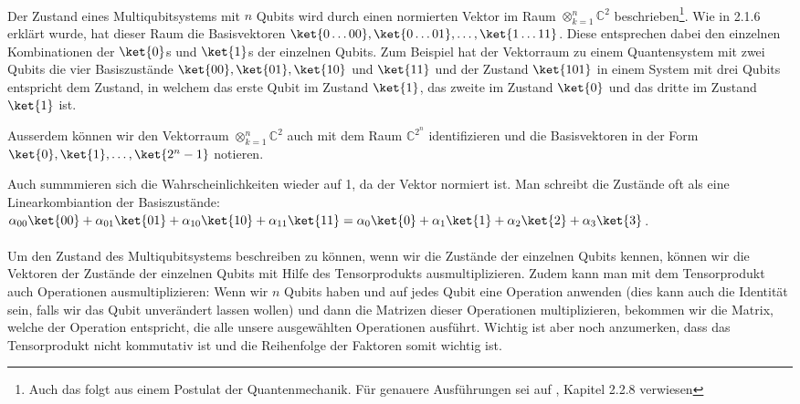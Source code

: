 \paragraph{}

Der Zustand eines Multiqubitsystems mit $n$ Qubits wird durch einen normierten Vektor im Raum $\otimes_{k = 1}^{n} \mathbb{C}^2$ beschrieben\footnote{Auch das folgt aus einem Postulat der Quantenmechanik. Für genauere Ausführungen sei auf \cite{QC}, Kapitel 2.2.8 verwiesen}. Wie in 2.1.6 erklärt wurde, hat dieser Raum die Basisvektoren $\ket{0\dots 00}, \ket{0\dots 01}, \dots, \ket{1\dots 11}$. Diese entsprechen dabei den einzelnen Kombinationen der $\ket{0}$s und $\ket{1}$s der einzelnen Qubits. Zum Beispiel hat der Vektorraum zu einem Quantensystem mit zwei Qubits die vier Basiszustände $\ket{00}, \ket{01}, \ket{10}$ und $\ket{11}$ und der Zustand $\ket{101}$ in einem System mit drei Qubits entspricht dem Zustand, in welchem das erste Qubit im Zustand $\ket{1}$, das zweite im Zustand $\ket{0}$ und das dritte im Zustand $\ket{1}$ ist. 

Ausserdem können wir den Vektorraum $\otimes_{k = 1}^{n} \mathbb{C}^2$ auch mit dem Raum $\mathbb{C}^{2^n}$ identifizieren und die Basisvektoren in der Form $\ket{0}, \ket{1}, \dots, \ket{2^n - 1}$ notieren.

Auch summmieren sich die Wahrscheinlichkeiten wieder auf 1, da der Vektor normiert ist. Man schreibt die Zustände oft als eine Linearkombiantion der Basiszustände: $\alpha_{00}\ket{00} + \alpha_{01}\ket{01} + \alpha_{10}\ket{10} + \alpha_{11}\ket{11} = \alpha_{0}\ket{0} + \alpha_{1}\ket{1} + \alpha_{2}\ket{2} + \alpha_{3}\ket{3}$.

\paragraph{}
Um den Zustand des Multiqubitsystems beschreiben zu können, wenn wir die Zustände der einzelnen Qubits kennen, können wir die Vektoren der Zustände der einzelnen Qubits mit Hilfe des Tensorprodukts ausmultiplizieren. Zudem kann man mit dem Tensorprodukt auch Operationen ausmultiplizieren: Wenn wir $n$ Qubits haben und auf jedes Qubit eine Operation anwenden (dies kann auch die Identität sein, falls wir das Qubit unverändert lassen wollen) und dann die Matrizen dieser Operationen multiplizieren, bekommen wir die Matrix, welche der Operation entspricht, die alle unsere ausgewählten Operationen ausführt. Wichtig ist aber noch anzumerken, dass das Tensorprodukt nicht kommutativ ist und die Reihenfolge der Faktoren somit wichtig ist.
